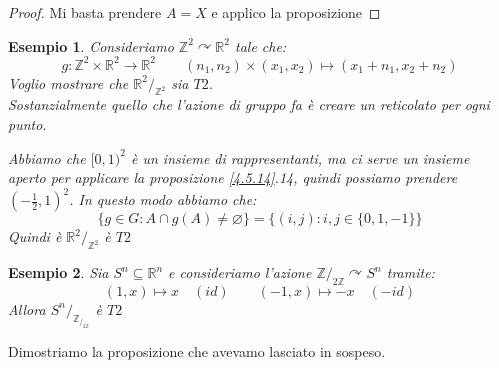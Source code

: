 \documentclass[11pt,a4paper,twoside]{article}
\newtheorem{es}{Esempio}
\theoremstyle{definition}
\begin{document}
\begin{proof}
	Mi basta prendere $A = X$ e applico la proposizione
\end{proof}

\begin{es}
	Consideriamo $\mathbb Z^2 \curvearrowright \mathbb R^2$ tale che:
	\[ g: \mathbb Z^2 \times \mathbb R^2 \to \mathbb R^2 \qquad (n_1,n_2) \times(x_1,x_2) \mapsto (x_1+n_1, x_2+n_2) \]
	Voglio mostrare che $\mathbb R^2/_{\mathbb Z^2}$ sia $T2$.\\
	\textit{Sostanzialmente quello che l'azione di gruppo fa è creare un reticolato per ogni punto}.
	\begin{center}
	\end{center}
	Abbiamo che $[0,1)^2$ è un insieme di rappresentanti, ma ci serve un insieme aperto per applicare la proposizione \ref{4.5.14}.14, quindi possiamo prendere $(-\frac 12, 1)^2$. In questo modo abbiamo che:
	\[\{ g \in G: A \cap g(A) \neq \varnothing \} = \{ (i,j) : i,j \in \{0,1,-1\} \}\]
	Quindi è $\mathbb R^2/_{\mathbb Z^2}$ è $T2$
\end{es}

\begin{es}
	Sia $S^n \subseteq \mathbb R^n$ e consideriamo l'azione $\mathbb Z/_{2 \mathbb Z} \curvearrowright S^n$ tramite:
	\[ (1,x) \mapsto x \quad (id) \qquad (-1,x) \mapsto -x \quad(-id)\]
	Allora $S^n/_{\mathbb Z_{/_{2\mathbb Z}}}$ è $T2$
\end{es}

Dimostriamo la proposizione che avevamo lasciato in sospeso.
\end{document}
